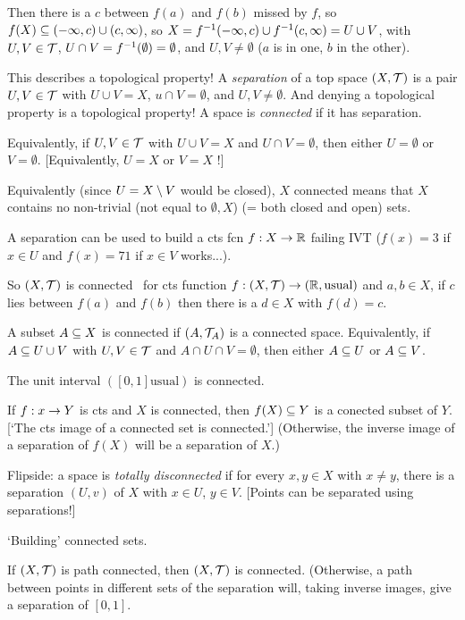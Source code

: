 \documentclass[12pt]{article}
\begin{document}
Then there is a $c$ between $f(a)$ and $f(b)$ missed by $f$, so $f(X)\subseteq (-\infty,c)\cup(c,\infty)$,
so $X=f^{-1}(-\infty,c)\cup f^{-1}(c,\infty)=U\cup V$, with $U,V\in{\mathcal T}$, $U\cap V=f^{-1}(\emptyset)=\emptyset$,
and $U,V\neq\emptyset$ ($a$ is in one, $b$ in the other).

This describes a topological property! A {\it separation} of a top space $(X,{\mathcal T})$ is a pair
$U,V\in{\mathcal T}$ with $U\cup V=X$, $u\cap V=\emptyset$, and $U,V\neq\emptyset$. 
And denying a topological property is a topological property! A space is 
{\it connected} if it has  separation.

Equivalently, if $U,V\in{\mathcal T}$ with $U\cup V=X$ and $U\cap V=\emptyset$, then either
$U = \emptyset$ or $V = \emptyset$. [Equivalently, $U=X$ or $V=X$ !]

Equivalently (since $U=X\setminus V$ would be closed), $X$ connected means that $X$
contains no non-trivial
(not equal to $\emptyset,X$)  (= both closed and open) sets.

A separation can be used to build a cts fcn $f:X\rightarrow{\mathbb R}$ failing IVT ($f(x)=3$ if $x\in U$
and $f(x)=71$ if $x\in V$ works...). 

So $(X,{\mathcal T})$ is connected \lra\ for  cts function
$f:(X,{\mathcal T})\rightarrow({\mathbb R},\textrm{usual})$ and $a,b\in X$, if $c$ lies between $f(a)$ and $f(b)$ 
then there is a $d\in X$ with $f(d)=c$.

A subset $A\subseteq X$ is connected if $(A,{\mathcal T}_A)$ is a connected space. Equivalently, 
if $A\subseteq U\cup V$ with $U,V\in{\mathcal T}$ and $A\cap U\cap V = \emptyset$, then either
$A\subseteq U$ or $A\subseteq V$.

The unit interval $([0,1]\textrm{usual})$ is connected.

If $f:x\rightarrow Y$ is cts and $X$ is connected, then $f(X)\subseteq Y$ is a conected subset of $Y$.
[`The cts image of a connected set is connected.']
(Otherwise, the inverse image of a separation of $f(X)$ will be a separation of $X$.)

Flipside: a space is {\it totally disconnected} if for every $x,y\in X$ with
$x\neq y$, there is a separation $(U,v)$ of $X$ with $x\in U$, $y\in V$. [Points
can be separated using separations!]

\ssk

`Building' connected sets.

If $(X,{\mathcal T})$ is path connected, then $(X,{\mathcal T})$ is connected. (Otherwise, a path
between points in different sets of the separation will, taking inverse images,
give a separation of $[0,1]$.
\end{document}
